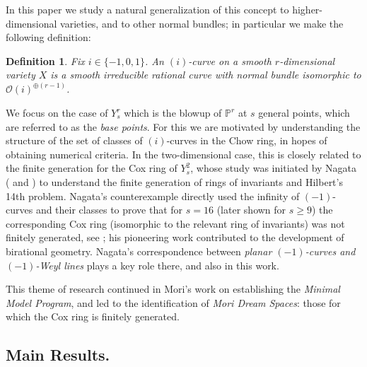 \documentclass[12pt]{article}
\newtheorem{definition}[equation]{Definition}
\numberwithin{equation}{section}
\numberwithin{subeq}{equation}
\def\calO{\mathcal{O}}
\def\bbP{\mathbb{P}}
\begin{document}
In this paper we study a natural generalization of this concept
to higher-dimensional varieties,
and to other normal bundles;
in particular we make the following definition:
\begin{definition}\label{i-curves}
Fix $i\in \{-1, 0, 1\}$.
An \emph{$(i)$-curve} on a smooth $r$-dimensional variety $X$
is a smooth irreducible rational curve
with normal bundle isomorphic to $\calO(i)^{\oplus(r-1)}$.
\end{definition}

We focus on the case of $Y^r_s$
which is the blowup of $\bbP^r$ at $s$ general points,
which are referred to as the \emph{base points}.
For this we are motivated by understanding the structure of the set of classes
of $(i)$-curves in the Chow ring,
in hopes of obtaining numerical criteria.
In the two-dimensional case,
this is closely related to the finite generation for the Cox ring of $Y^2_s$,
whose study was initiated by Nagata 
(\cite{nagatab} and \cite{nagata})
to understand the finite generation of rings of invariants and Hilbert's 14th problem. 
Nagata's counterexample directly used the infinity of $(-1)$-curves and their classes
to prove that for $s=16$ (later shown for $s \geq 9$) the corresponding Cox ring (isomorphic to the relevant ring of invariants) was not finitely generated,
see \cite[Theorem 2a]{nagata1}; 
his pioneering work contributed to the development of birational geometry.
Nagata's correspondence between {\it planar $(-1)$-curves and $(-1)$-Weyl lines} plays a key role there, and also in this work.

This theme of research continued in Mori's work on establishing
the \emph{Minimal Model Program},
and led to the identification of \emph{Mori Dream Spaces}:
those for which the Cox ring is finitely generated.

\subsection{Main Results.}


\end{document}
